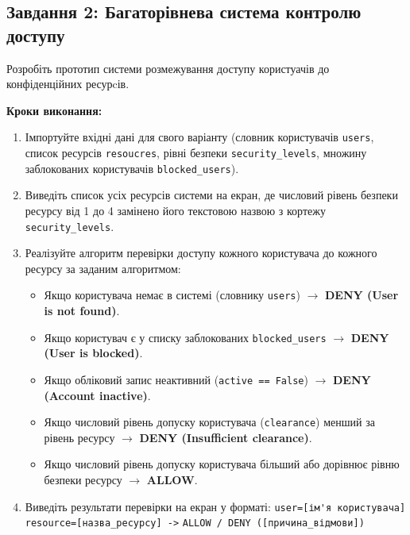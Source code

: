 \documentclass[12pt, a4paper]{article}
\begin{document}
\subsection{Завдання 2: Багаторівнева система контролю доступу}
Розробіть прототип системи розмежування доступу користуачів до конфіденційних ресурcів.

\textbf{Кроки виконання:}
\begin{enumerate}
	\item Імпортуйте вхідні дані для свого варіанту (словник користувачів \verb|users|, список ресурсів \verb|resoucres|, рівні безпеки \verb|security_levels|, множину заблокованих користувачів \verb|blocked_users|).
	\item Виведіть список усіх ресурсів системи на екран, де числовий рівень безпеки  ресурсу від 1 до 4 замінено його текстовою назвою з кортежу \verb|security_levels|.
	\item Реалізуйте алгоритм перевірки доступу кожного користувача до кожного ресурсу за заданим алгоритмом:
		\begin{itemize}
			\item Якщо користувача немає в системі (словнику \verb|users|) $\rightarrow$ \textbf{DENY (User is not found)}.
			\item Якщо користувач є у списку заблокованих \verb|blocked_users| $\rightarrow$ \textbf{DENY (User is blocked)}.
			\item Якщо обліковий запис неактивний (\verb|active == False|) $\rightarrow$ \textbf{DENY (Account inactive)}.
			\item Якщо числовий рівень допуску користувача (\verb|clearance|) менший за рівень ресурсу $\rightarrow$ \textbf{DENY (Insufficient clearance)}.
			\item Якщо числовий рівень допуску користувача більший або дорівнює рівню безпеки ресурсу $\rightarrow$ \textbf{ALLOW}.
		\end{itemize}
	\item Виведіть результати перевірки на екран у форматі: \verb|user=[ім'я користувача] resource=[назва_ресурсу] ->|
		\verb|ALLOW / DENY ([причина_відмови])|
\end{enumerate}
\end{document}
